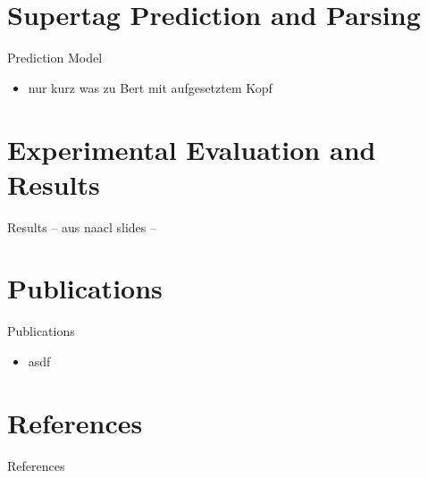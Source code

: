 \documentclass[aspectratio=169, 10pt]{beamer}
\begin{document}
    \section{Supertag Prediction and Parsing}
    \begin{frame}{Prediction Model}
        \begin{itemize}
            \item nur kurz was zu Bert mit aufgesetztem Kopf
        \end{itemize}
    \end{frame}


    \section{Experimental Evaluation and Results}
    \begin{frame}{Results}
        -- aus naacl slides --
    \end{frame}


    \section{Publications}
    \begin{frame}{Publications}
        \begin{itemize}
            \item asdf
        \end{itemize}
    \end{frame}


    \section*{References}
     \begin{frame}{References}
        
        
    \end{frame}
\end{document}
